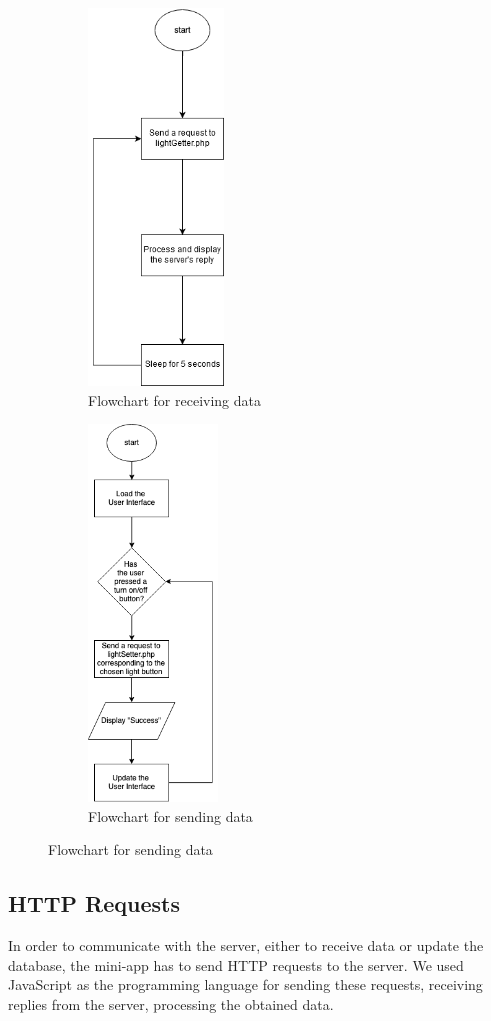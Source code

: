\documentclass[12pt,a4paper]{report}
\begin{document}
\begin{figure}[H]
	\begin{subfigure}{.5\textwidth}
		\centering
		\includegraphics[height= 10cm, width=.5\linewidth]{figures/miniFlow1.png}
		\caption{Flowchart for receiving data}
	\end{subfigure}
	\begin{subfigure}{.5\textwidth}
		\centering
		\includegraphics[height= 10cm,width=.5\linewidth]{figures/miniFlow2.png}
		\caption{Flowchart for sending data}
	\end{subfigure}
\end{figure}



\subsection{HTTP Requests}
In order to communicate with the server, either to receive data or update the database, the mini-app has to send HTTP requests to the server. We used JavaScript as the programming language for sending these requests, receiving replies from the server, processing the obtained data. 
\end{document}
